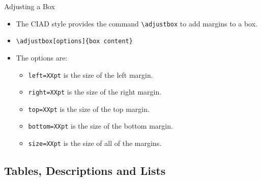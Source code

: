 \documentclass[english,sectioncirclenumberstyle]{ciadbeamer}
\begin{document}
\begin{frame}{Adjusting a Box}
	\begin{itemize}
	\item The CIAD style provides the command \texttt{{\textbackslash}adjustbox} to add margins to a box.
	\vspace{1em}
	\item \texttt{{\textbackslash}adjustbox[options]\{box content\}}
	\vspace{1em}
	\item The options are:
		\begin{itemize}
		\item \texttt{left=XXpt} is the size of the left margin.
		\item \texttt{right=XXpt} is the size of the right margin.
		\item \texttt{top=XXpt} is the size of the top margin.
		\item \texttt{bottom=XXpt} is the size of the bottom margin.
		\item \texttt{size=XXpt} is the size of all of the margins.
		\end{itemize}
	\end{itemize}
\end{frame}

\subsection{Tables, Descriptions and Lists}
\subsectiontableofcontentslide
\end{document}

